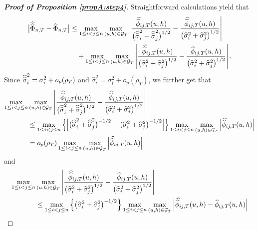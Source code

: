 \begin{proof}[\textnormal{\textbf{Proof of Proposition \ref{propA:step4}}}] 
Straightforward calculations yield that
\begin{align*}
\begin{split}
\big| \doublehattwo{\Phi}_{n, T} - \widehat{\Phi}_{n, T} \big| &\le \max_{1 \le i < j \le n} \max_{(u,h) \in \mathcal{G}_T} \left|\frac{\doublehat{\phi}_{ij,T}(u,h)}{\big(\doublehattwo{\sigma}_i^2 + \doublehattwo{\sigma}_j^2\big)^{1/2}} - \frac{\doublehat{\phi}_{ij,T}(u,h)}{\big(\widehat{\sigma}_i^2 + \widehat{\sigma}_j^2\big)^{1/2}}\right| \\
&\quad+\max_{1 \le i < j \le n} \max_{(u,h) \in \mathcal{G}_T} \left|\frac{\doublehat{\phi}_{ij,T}(u,h)}{\big(\widehat{\sigma}_i^2 + \widehat{\sigma}_j^2\big)^{1/2}} - \frac{\widehat{\phi}_{ij,T}(u,h)} {\big( \widehat{\sigma}_i^2 + \widehat{\sigma}_j^2 \big)^{1/2}} \right|.
\end{split}
\end{align*}
Since $\widehat{\widehat{\sigma}}_i^2 = \sigma_i^2 + o_p(\rho_T)$ and $\widehat{\sigma}_i^2 = \sigma_i^2 + o_p(\rho_T)$, we further get that 
\begin{align*}
\max_{1 \le i < j \le n} &\max_{(u,h) \in \mathcal{G}_T} \left|\frac{\doublehat{\phi}_{ij,T}(u,h)}{\big(\doublehattwo{\sigma}_i^2 + \doublehattwo{\sigma}_j^2\big)^{1/2}} - \frac{\doublehat{\phi}_{ij,T}(u,h)}{\big(\widehat{\sigma}_i^2 + \widehat{\sigma}_j^2\big)^{1/2}}\right|  \\
&\le\max_{1 \le i < j \le n} \left\{ \Big|\big(\doublehattwo{\sigma}_i^2 + \doublehattwo{\sigma}_j^2 \big)^{-1/2} - \big(\widehat{\sigma}_i^2 + \widehat{\sigma}_j^2 \big)^{-1/2}\Big| \right\} \max_{1 \le i < j \le n} \max_{(u,h) \in \mathcal{G}_T} \Big|\doublehat{\phi}_{ij,T}(u,h)\Big| \\
& = o_p(\rho_T) \max_{1 \le i < j \le n} \max_{(u,h) \in \mathcal{G}_T} \Big|\doublehat{\phi}_{ij,T}(u,h)\Big|
\end{align*}
and 
\begin{align*}
\max_{1 \le i < j \le n} &\max_{(u,h) \in \mathcal{G}_T} \left|\frac{\doublehat{\phi}_{ij,T}(u,h)}{\big(\widehat{\sigma}_i^2 + \widehat{\sigma}_j^2\big)^{1/2}} - \frac{\widehat{\phi}_{ij,T}(u,h)} {\big( \widehat{\sigma}_i^2 + \widehat{\sigma}_j^2\big)^{1/2}} \right| \\
 & \le \max_{1\le i < j \le n} \left\{ \big(\widehat{\sigma}_i^2 + \widehat{\sigma}_j^2 \big)^{-1/2} \right\} \max_{1\le i < j \le n} \max_{(u,h) \in \mathcal{G}_T} \Big| \doublehat{\phi}_{ij, T}(u,h) - \widehat{\phi}_{ij, T}(u,h) \Big| \\

\end{align*}
\end{proof}
